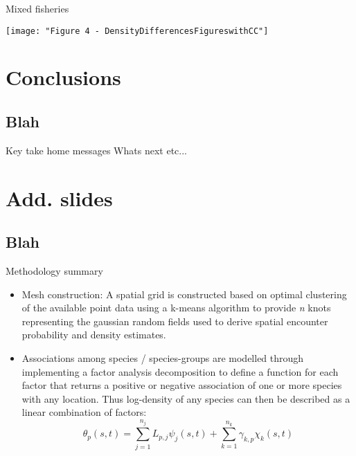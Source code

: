 \documentclass[xcolor=x11names,compress]{beamer}
\renewcommand{\(}{\begin{columns}}
\renewcommand{\)}{\end{columns}}
\newcommand{\<}[1]{\begin{column}{#1}}
\renewcommand{\>}{\end{column}}
\begin{document}
\begin{frame}{Mixed fisheries}
	
\centering
\texttt{[image: "Figure 4 - DensityDifferencesFigureswithCC"]}

\end{frame}


\section{Conclusions}
\subsection{Blah}

\begin{frame}
	Key take home messages
	Whats next etc...
\end{frame}



\section{Add. slides}
\subsection{Blah}
\begin{frame}{Methodology summary}

\begin{itemize}
	\small
	\setlength\itemsep{2em}

	\item Mesh construction: A spatial grid is constructed based on optimal
		clustering of the available point data using a k-means
		algorithm to provide \textit{n} knots representing the gaussian
		random fields used to derive spatial encounter probability and
		density estimates.

	\item  Associations among species / species-groups are modelled through
		implementing a factor analysis decomposition to define a
		function for each factor that returns a positive or negative
		association of one or more species with any location. Thus
		log-density of any species can then be described as a linear
		combination of factors:
		\begin{equation}
			\theta_{p}(s,t) = \sum_{j=1}^{n_{j}}
			L_{p,j}\psi_{j}(s,t) +\sum_{k=1}^{n_{k}}
			\gamma_{k,p}\chi_{k}(s,t)
		\end{equation}
	
\end{itemize}

\end{frame}
\end{document}
